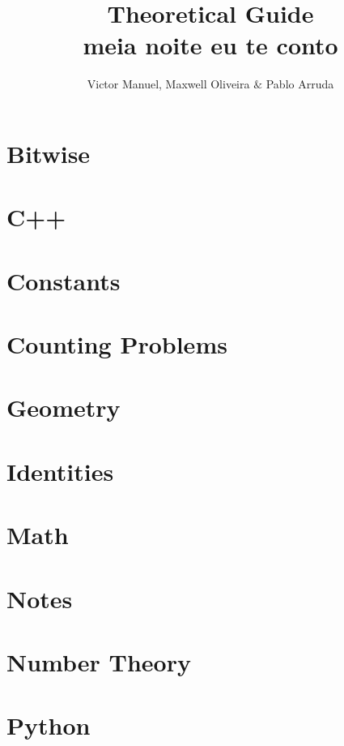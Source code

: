 \documentclass[10pt, twocolumn]{article}
\title{\vspace{-2cm}\textbf{Theoretical Guide\\meia noite eu te conto}}
\author{Victor Manuel, Maxwell Oliveira $\&$ Pablo Arruda}
\affil{\textit{Thanks to UFMG - Humuhumunukunukuapua'a}}
\date{}
\begin{document}
\maketitle\section{Bitwise}


\section{C++}






\section{Constants}

\section{Counting Problems}

\section{Geometry}
\section{Identities}

\section{Math}


\section{Notes}

\section{Number Theory}








\section{Python}
\end{document}
